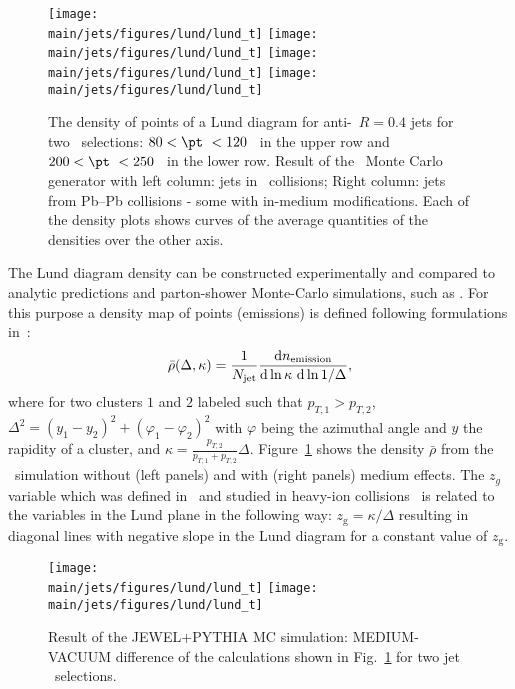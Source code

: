 \begin{figure}[htbp]
	\centering
	\texttt{[image: \\main/jets/figures/lund/lund\_t]}
	\texttt{[image: \\main/jets/figures/lund/lund\_t]}
	\texttt{[image: \\main/jets/figures/lund/lund\_t]}
	\texttt{[image: \\main/jets/figures/lund/lund\_t]}
	\caption{The density of points of a Lund diagram for anti-\kT\ $R=0.4$ jets for two \pt\ selections: $80 < \pt\ < 120$ \gevc\ in the upper row and $200 < \pt\ < 250$ \gevc\ in the lower row. Result of the \jewel\ Monte Carlo generator with left column: jets in \pp\ collisions; Right column: jets from Pb--Pb collisions - some with in-medium modifications. Each of the density plots shows curves of the average quantities of the densities over the other axis.}
	\label{fig:Lund_jets}
\end{figure}

The Lund diagram density can be constructed experimentally and compared to analytic predictions and parton-shower Monte-Carlo simulations, such as \jewel. For this purpose a density map of points (emissions) is defined following formulations in~\cite{Dreyer:2018nbf}: 
\begin{equation}
\bar{\rho}(\Delta, \kappa) = \frac{1}{N_{\rm jet}} \frac{\mathrm{d}n_{\rm emission}}{\mathrm{d} \ln \kappa~\mathrm{d} \ln 1/\Delta},
\end{equation}
where for two clusters $1$ and $2$ labeled such that $p_{T,1} > p_{T,2}$, $\Delta^{2} = (y_1 - y_2)^2 + (\varphi_1 - \varphi_2)^2$ with $\varphi$ being the azimuthal angle and $y$ the rapidity of a cluster, and $\kappa=\frac{p_{T,2}}{p_{T,1} + p_{T,2}}\Delta$. Figure~\ref{fig:Lund_jets} shows the density $\bar{\rho}$ from the \jewel\ simulation without (left panels) and with (right panels) medium effects. 
The $z_{g}$ variable which was defined in~\cite{Larkoski:2015lea} and studied in heavy-ion collisions~\cite{Sirunyan:2017bsd} is related to the variables in the Lund plane in the following way: $z_{\mathrm{g}} = \kappa/\Delta$ resulting in diagonal lines with negative slope in the Lund diagram for a constant value of $z_\mathrm{g}$.
%
\begin{figure}[htbp]
	\centering
	\texttt{[image: \\main/jets/figures/lund/lund\_t]}
	\texttt{[image: \\main/jets/figures/lund/lund\_t]}
	\caption{Result of the JEWEL+PYTHIA MC simulation: MEDIUM-VACUUM difference of the calculations shown in Fig.~\ref{fig:Lund_jets} for two jet \pt\ selections.}
	\label{fig:Lund_jets_vac_med}
\end{figure}

